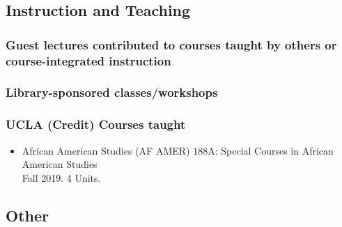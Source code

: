 

\subsection{Instruction and Teaching}

\subsubsection{Guest lectures contributed to courses taught by others or course-integrated instruction}

\subsubsection{Library-sponsored classes/workshops}

\nocite{*}
\printbibliography[keyword={instr-lib-spnsr},title={Library-sponsored classes/workshops},heading=none]

\subsubsection{UCLA (Credit) Courses taught}

\begin{itemize}[label={}]
    \item African American Studies (AF AMER) 188A: Special Courses in African American Studies \\
    Fall 2019. 4 Units.
\end{itemize}

\subsection{Other}
